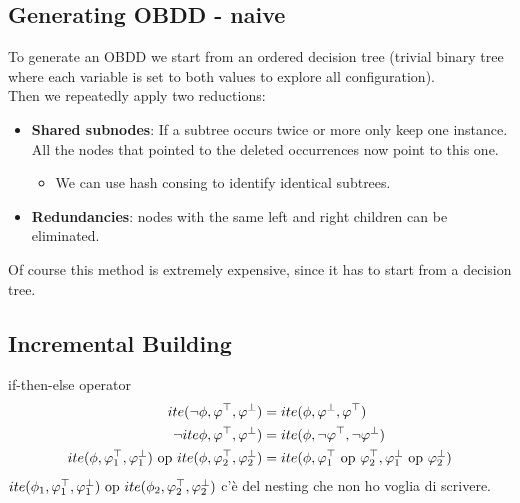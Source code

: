 \documentclass{article}
\begin{document}
\subsection{Generating OBDD - naive}
To generate an OBDD we start from an ordered decision tree (trivial binary tree where each variable is set to both values to explore all configuration).\\
Then we repeatedly apply two reductions:
\begin{itemize}
    \item \textbf{Shared subnodes}: If a subtree occurs twice or more only keep one instance. All the nodes that pointed to the deleted occurrences now point to this one.
        \begin{itemize}
            \item We can use hash consing to identify identical subtrees.
        \end{itemize}
    \item \textbf{Redundancies}: nodes with the same left and right children can be eliminated.
\end{itemize}
Of course this method is extremely expensive, since it has to start from a decision tree.

\subsection{Incremental Building}
\begin{callout}[blue]{if-then-else operator}
    \begin{align*}
        ite(\neg\phi,\varphi^\top,\varphi^\bot) &= ite(\phi,\varphi^\bot,\varphi^\top) \\
        \neg ite\phi,\varphi^\top,\varphi^\bot) &= ite(\phi,\neg\varphi^\top,\neg\varphi^\bot) \\
        ite(\phi,\varphi_1^\top,\varphi_1^\bot) \text{ op } ite(\phi,\varphi_2^\top,\varphi_2^\bot)
                                                &= ite(\phi,\varphi_1^\top\text{ op }\varphi_2^\top,\varphi_1^\bot\text{ op }\varphi_2^\bot) \\
    \end{align*}
    $ite(\phi_1,\varphi_1^\top,\varphi_1^\bot) \text{ op } ite(\phi_2,\varphi_2^\top,\varphi_2^\bot)$ c'è del nesting che non ho voglia di scrivere.
\end{callout}
\end{document}
